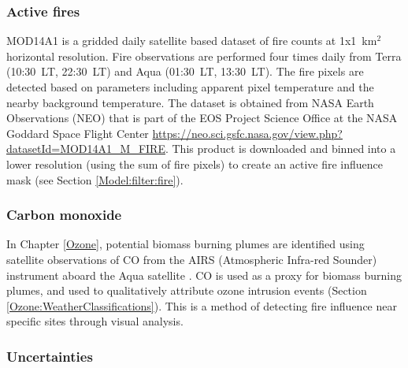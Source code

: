     \subsubsection{Active fires}
      \label{Model:datasets:MOD14A1}
      MOD14A1 is a gridded daily satellite based dataset of fire counts at 1x1~km$^2$ horizontal resolution.
      Fire observations are performed four times daily from Terra (10:30~LT, 22:30~LT) and Aqua (01:30~LT, 13:30~LT).
      The fire pixels are detected based on parameters including apparent pixel temperature and the nearby background temperature.
      The dataset is obtained from NASA Earth Observations (NEO) that is part of the EOS Project Science Office at the NASA Goddard Space Flight Center \url{https://neo.sci.gsfc.nasa.gov/view.php?datasetId=MOD14A1_M_FIRE}.
      This product is downloaded and binned into a lower resolution (using the sum of fire pixels) to create an active fire influence mask (see Section \ref{Model:filter:fire}).
      
    \subsubsection{Carbon monoxide}
      \label{Model:datasets:AIRS}
      
      In Chapter \ref{Ozone}, potential biomass burning plumes are identified using satellite observations of CO from the AIRS (Atmospheric Infra-red Sounder) instrument aboard the Aqua satellite \parencite{AIRS3STD}.
      CO is used as a proxy for biomass burning plumes, and used to qualitatively attribute ozone intrusion events (Section \ref{Ozone:WeatherClassifications}).
      This is a method of detecting fire influence near specific sites through visual analysis.
      
  
    \subsubsection{Uncertainties}
      
